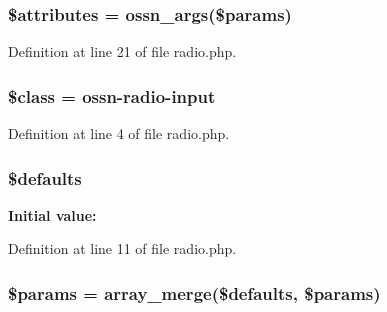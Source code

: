 \subsubsection[{\texorpdfstring{\$attributes}{$attributes}}]{\setlength{\rightskip}{0pt plus 5cm}\$attributes = {\bf ossn\+\_\+args}(\$params)}\hypertarget{radio_8php_adc851f7a62250e75df0490c0280aef4c}{}\label{radio_8php_adc851f7a62250e75df0490c0280aef4c}


Definition at line 21 of file radio.\+php.

\subsubsection[{\texorpdfstring{\$class}{$class}}]{\setlength{\rightskip}{0pt plus 5cm}\$class = \textquotesingle{}ossn-\/radio-\/{\bf input}\textquotesingle{}}\hypertarget{radio_8php_a252ba022809910ea710a068fc1bab657}{}\label{radio_8php_a252ba022809910ea710a068fc1bab657}


Definition at line 4 of file radio.\+php.

\subsubsection[{\texorpdfstring{\$defaults}{$defaults}}]{\setlength{\rightskip}{0pt plus 5cm}\${\bf defaults}}\hypertarget{radio_8php_a34ddfd723e30abea0a92b81f4443ac6a}{}\label{radio_8php_a34ddfd723e30abea0a92b81f4443ac6a}
{\bfseries Initial value\+:}


Definition at line 11 of file radio.\+php.

\subsubsection[{\texorpdfstring{\$params}{$params}}]{\setlength{\rightskip}{0pt plus 5cm}\$params = array\+\_\+merge(\${\bf defaults}, \$params)}\hypertarget{radio_8php_afe68e6fbe7acfbffc0af0c84a1996466}{}\label{radio_8php_afe68e6fbe7acfbffc0af0c84a1996466}


